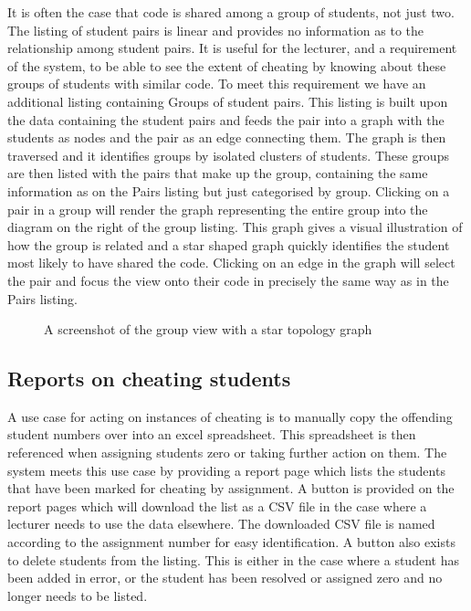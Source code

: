 \documentclass[11pt,a4paper]{article}
\begin{document}
It is often the case that code is shared among a group of students, not just two. The listing of student pairs is linear and provides no information as to the relationship among student pairs. It is useful for the lecturer, and a requirement of the system, to be able to see the extent of cheating by knowing about these groups of students with similar code. To meet this requirement we have an additional listing containing Groups of student pairs. This listing is built upon the data containing the student pairs and feeds the pair into a graph with the students as nodes and the pair as an edge connecting them. The graph is then traversed and it identifies groups by isolated clusters of students. These groups are then listed with the pairs that make up the group, containing the same information as on the Pairs listing but just categorised by group. Clicking on a pair in a group will render the graph representing the entire group into the diagram on the right of the group listing. This graph gives a visual illustration of how the group is related and a star shaped graph quickly identifies the student most likely to have shared the code. Clicking on an edge in the graph will select the pair and focus the view onto their code in precisely the same way as in the Pairs listing.

\begin{figure}[h!]
  \caption{A screenshot of the group view with a star topology graph}
  \label{fig:graphview}
\end{figure}

\subsection{Reports on cheating students}

A use case for acting on instances of cheating is to manually copy the offending student numbers over into an excel spreadsheet. This spreadsheet is then referenced when assigning students zero or taking further action on them. The system meets this use case by providing a report page which lists the students that have been marked for cheating by assignment. A button is provided on the report pages which will download the list as a CSV file in the case where a lecturer needs to use the data elsewhere. The downloaded CSV file is named according to the assignment number for easy identification. A button also exists to delete students from the listing. This is either in the case where a student has been added in error, or the student has been resolved or assigned zero and no longer needs to be listed.
\end{document}
